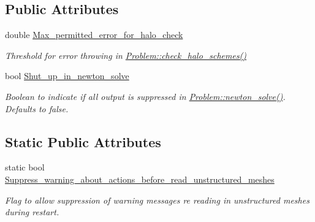 \subsection*{Public Attributes}
\begin{DoxyCompactItemize}
\item 
double \hyperlink{classoomph_1_1Problem_aeadae1fc5f49e66223ee09c69a9e506d}{Max\+\_\+permitted\+\_\+error\+\_\+for\+\_\+halo\+\_\+check}
\begin{DoxyCompactList}\small\item\em Threshold for error throwing in \hyperlink{classoomph_1_1Problem_a8dd5cb241ce6218fb476931e0879d7c8}{Problem\+::check\+\_\+halo\+\_\+schemes()} \end{DoxyCompactList}\item 
bool \hyperlink{classoomph_1_1Problem_ab4a3743c23a2d1eed56981484636c958}{Shut\+\_\+up\+\_\+in\+\_\+newton\+\_\+solve}
\begin{DoxyCompactList}\small\item\em Boolean to indicate if all output is suppressed in \hyperlink{classoomph_1_1Problem_a62a989ae9a9169b9d905f844db59787f}{Problem\+::newton\+\_\+solve()}. Defaults to false. \end{DoxyCompactList}\end{DoxyCompactItemize}
\subsection*{Static Public Attributes}
\begin{DoxyCompactItemize}
\item 
static bool \hyperlink{classoomph_1_1Problem_a223a45fe6b1c80ee0109037b63e162f9}{Suppress\+\_\+warning\+\_\+about\+\_\+actions\+\_\+before\+\_\+read\+\_\+unstructured\+\_\+meshes}
\begin{DoxyCompactList}\small\item\em Flag to allow suppression of warning messages re reading in unstructured meshes during restart. \end{DoxyCompactList}\end{DoxyCompactItemize}
